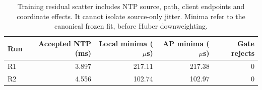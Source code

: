 
\begin{table}[t]\centering\small
\caption{Training residual scatter includes NTP source, path, client endpoints and coordinate effects. It cannot isolate source-only jitter. Minima refer to the canonical frozen fit, before Huber downweighting.}
\label{tab:hybrid-jitter}\begin{tabular}{lrrrr}\toprule
Run & Accepted NTP (ms) & Local minima ($\mu$s) & AP minima ($\mu$s) & Gate rejects \\ \midrule
R1 & 3.897 & 217.11 & 217.38 & 0 \\
R2 & 4.556 & 102.74 & 102.97 & 0 \\
\bottomrule\end{tabular}
\end{table}

